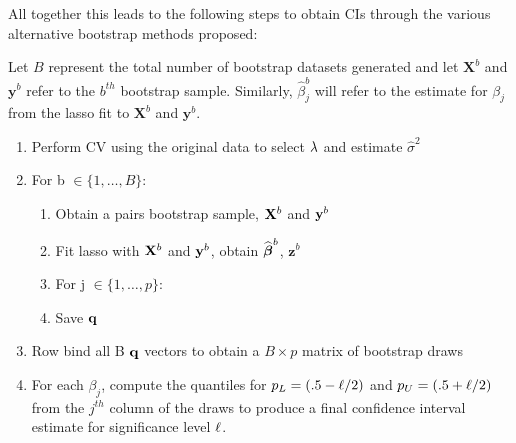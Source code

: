 
All together this leads to the following steps to obtain CIs through the various alternative bootstrap methods proposed:

Let $B$ represent the total number of bootstrap datasets generated and let $\boldsymbol{X}^b$ and $\boldsymbol{y}^b$ refer to the $b^{th}$ bootstrap sample. Similarly, $\hat{\beta}^b_j$ will refer to the estimate for $\beta_j$ from the lasso fit to $\boldsymbol{X}^b$ and $\boldsymbol{y}^b$.

\begin{enumerate}
\item Perform CV using the original data to select $\lambda$ and estimate $\hat{\sigma}^2$
\item For b $\in \lbrace 1, \ldots, B \rbrace$:
\begin{enumerate}
\item Obtain a pairs bootstrap sample, $\mathbf{X}^b$ and $\mathbf{y}^b$
\item Fit lasso with $\mathbf{X}^b$ and $\mathbf{y}^b$, obtain $\widehat{\boldsymbol{\beta}}^b$, $\boldsymbol{z}^b$
\item For j $\in \lbrace 1, \ldots, p \rbrace$:
	\begin{algorithmic}
    \EndCase
    \EndCase
    \EndCase
    \EndCase
	\EndSwitch 
	\end{algorithmic}
\item Save $\mathbf{q}$
\end{enumerate}
\item Row bind all B $\mathbf{q}$ vectors to obtain a $B \times p$ matrix of bootstrap draws 
\item For each $\beta_j$, compute the quantiles for $p_L = (.5 - \ell/2)$ and $p_U = (.5 + \ell/2)$ from the $j^{th}$ column of the draws to produce a final confidence interval estimate for significance level $\ell$.
\end{enumerate}

